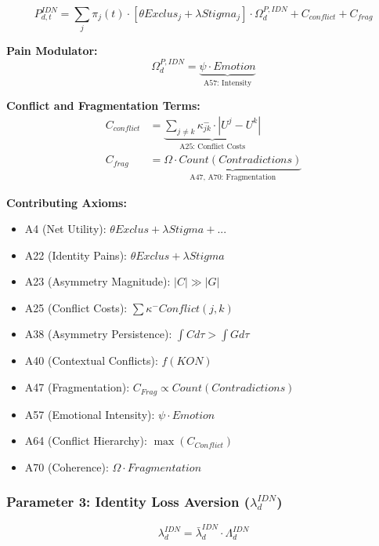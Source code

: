 \begin{tcolorbox}[colback=orange!5!white, colframe=orange!50!black]
\begin{equation}
\boxed{
P^{IDN}_{d,t} = \sum_j \pi_j(t) \cdot \left[ \theta Exclus_j + \lambda Stigma_j \right] \cdot \Omega^{P,IDN}_d + C_{conflict} + C_{frag}
}
\end{equation}
\end{tcolorbox}

\textbf{Pain Modulator:}
\begin{equation}
\Omega^{P,IDN}_d = \underbrace{\psi \cdot Emotion}_{\text{A57: Intensity}}
\end{equation}

\textbf{Conflict and Fragmentation Terms:}
\begin{align}
C_{conflict} &= \underbrace{\sum_{j \neq k} \kappa^-_{jk} \cdot |U^j - U^k|}_{\text{A25: Conflict Costs}} \\
C_{frag} &= \underbrace{\Omega \cdot Count(Contradictions)}_{\text{A47, A70: Fragmentation}}
\end{align}

\textbf{Contributing Axioms:}
\begin{itemize}
\item A4 (Net Utility): $\theta Exclus + \lambda Stigma + ...$
\item A22 (Identity Pains): $\theta Exclus + \lambda Stigma$
\item A23 (Asymmetry Magnitude): $|C| \gg |G|$
\item A25 (Conflict Costs): $\sum \kappa^- Conflict(j,k)$
\item A38 (Asymmetry Persistence): $\int C d\tau > \int G d\tau$
\item A40 (Contextual Conflicts): $f(KON)$
\item A47 (Fragmentation): $C_{Frag} \propto Count(Contradictions)$
\item A57 (Emotional Intensity): $\psi \cdot Emotion$
\item A64 (Conflict Hierarchy): $\max(C_{Conflict})$
\item A70 (Coherence): $\Omega \cdot Fragmentation$
\end{itemize}

\subsubsection{Parameter 3: Identity Loss Aversion ($\lambda^{IDN}_{d}$)}

\begin{tcolorbox}[colback=orange!5!white, colframe=orange!50!black]
\begin{equation}
\boxed{
\lambda^{IDN}_{d} = \bar{\lambda}^{IDN}_d \cdot \Lambda^{IDN}_d
}
\end{equation}
\end{tcolorbox}

